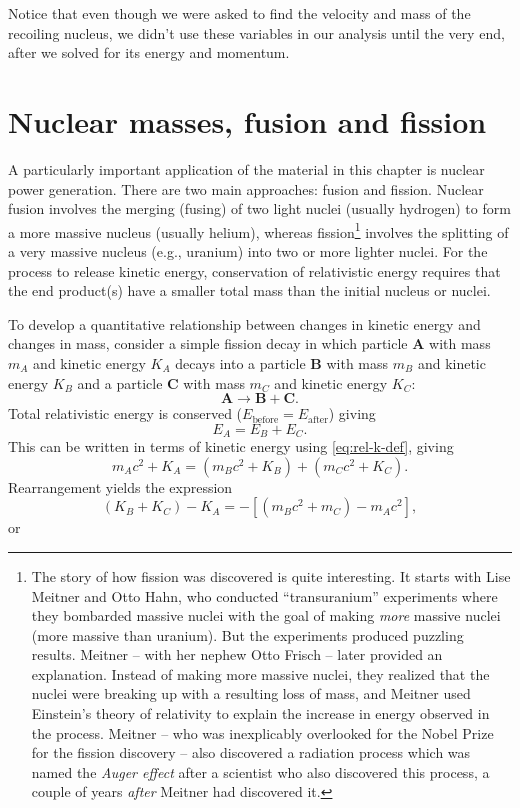 \begin{example}
Notice that even though we were asked to find the velocity and mass
of the recoiling nucleus, we didn't use these variables in our
analysis until the very end, after we solved for its energy and
momentum.
\end{example}

\section{Nuclear masses, fusion and fission}

A particularly important application of the material in this chapter
is nuclear power generation.  There are two main approaches: fusion
and fission.  Nuclear fusion involves the merging (fusing) of two light
nuclei (usually hydrogen) to form a more massive nucleus (usually helium),
whereas fission\footnote{The story of how fission was discovered is quite
interesting. It starts with Lise Meitner and Otto Hahn, who conducted
``transuranium'' experiments where they bombarded massive nuclei with the
goal of making \textit{more} massive nuclei (more massive than uranium). But
the experiments produced puzzling results.  Meitner -- with her nephew
Otto Frisch -- later provided an explanation.  Instead of making more
massive nuclei, they realized that the nuclei were breaking up with a
resulting loss of mass, and Meitner used Einstein's theory of relativity
to explain the increase in energy observed in the process. Meitner -- who
was inexplicably overlooked for the Nobel Prize for the fission discovery
-- also discovered a radiation process which was named the \emph{Auger
effect} after a scientist who also discovered this process, a couple of
years \textit{after} Meitner had discovered it.} involves the splitting of
a very massive nucleus (e.g., uranium) into two or more lighter nuclei.
For the process to release kinetic energy, conservation of relativistic
energy requires that the end product(s) have a smaller total mass
than the initial nucleus or nuclei.  

To develop a quantitative relationship between changes in kinetic 
energy and changes in mass, consider a simple fission decay
in which particle \textbf{A} with mass $m_A$ and kinetic energy
$K_A$ decays into a  particle \textbf{B} with mass $m_B$ and kinetic energy
$K_B$ and a particle \textbf{C} with mass $m_C$ and kinetic energy
$K_C$:
\[   \textbf{A} \longrightarrow \textbf{B} + \textbf{C}.  \]
Total relativistic energy is conserved ($E_\text{before} = 
E_\text{after}$) giving
\begin{equation}
E_A =  E_B + E_C.
\end{equation}
This can be written in terms of kinetic energy using 
\eqref{eq:rel-k-def}, giving 
\begin{equation}
m_Ac^2 + K_A =  (m_Bc^2 + K_B) + (m_Cc^2 + K_C).
\end{equation}
Rearrangement yields the expression
\begin{equation}
(K_B + K_C) - K_A = -\left[(m_Bc^2 +m_C) - m_Ac^2\right],
\end{equation}
or
 
